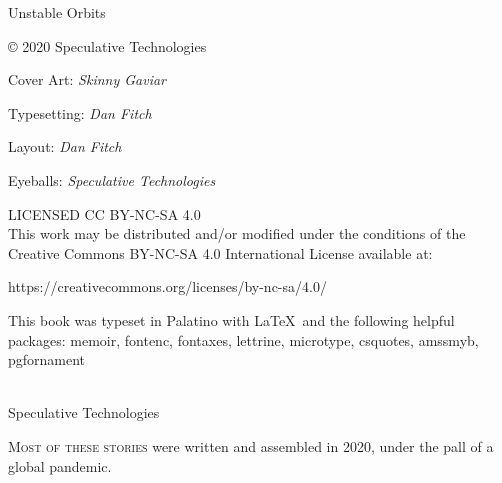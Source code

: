 



\pagestyle{empty}

\mainmatter
\raggedbottom

{
\null\vfill

\begin{flushleft}

{\small

{\variexfont{}Unstable Orbits}

\copyright{} 2020 {\tubefont{}Speculative Technologies}

\bigskip

Cover Art: \emph{Skinny Gaviar}

Typesetting: \emph{Dan Fitch}

Layout: \emph{Dan Fitch}

Eyeballs: \emph{Speculative Technologies}

\bigskip

LICENSED CC BY-NC-SA 4.0 \\
This work may be distributed and/or modified under the conditions of the Creative Commons BY-NC-SA 4.0 International License available at:
\begin{monotype}
https://creativecommons.org/licenses/by-nc-sa/4.0/
\end{monotype}

This book was typeset in Palatino with \LaTeX\ and the following helpful packages:
  memoir,
  fontenc,
  fontaxes,
  lettrine,
  microtype,
  csquotes,
  amssmyb,
  pgfornament
\bigskip
}
\end{flushleft}
}

\clearpage
\pagestyle{plain}

\begingroup%
\centering
\vspace*{24pt}
{\HUGE {}}\\[\baselineskip]
{\Huge \tubefont Speculative Technologies}\\[\baselineskip]
\vfill\null
\endgroup



\renewcommand{\contentsname}{}

{\setlength{\beforechapskip}{0pt}
\begin{KeepFromToc}
  \tableofcontents*
\end{KeepFromToc}
}

\vfill
\specsep{}

\lettrine{M}{ost of these stories} were written and assembled in 2020, under the pall of a global pandemic.

